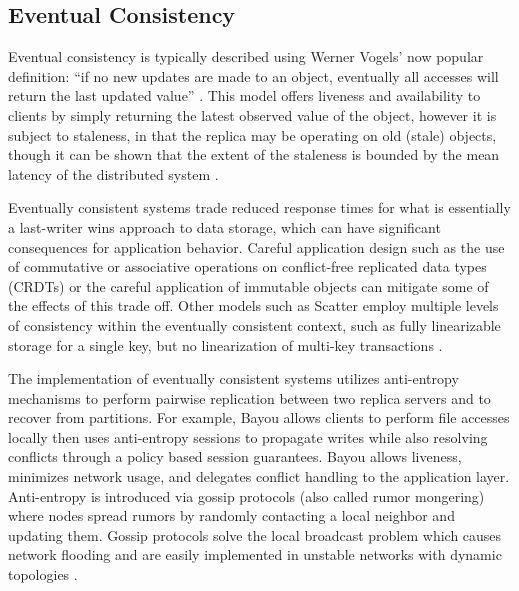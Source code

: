 \documentclass[letterpaper,twocolumn,10pt]{article}
\begin{document}
\subsection{Eventual Consistency}

Eventual consistency is typically described using Werner Vogels' now popular definition: ``if no new updates are made to an object, eventually all accesses will return the last updated value'' \cite{vogels_eventually_2009}. This model offers liveness and availability to clients by simply returning the latest observed value of the object, however it is subject to staleness, in that the replica may be operating on old (stale) objects, though it can be shown that the extent of the staleness is bounded by the mean latency of the distributed system \cite{bailis_quantifying_2014,bailis_probabilistically_2012}.

Eventually consistent systems trade reduced response times for what is essentially a last-writer wins approach to data storage, which can have significant consequences for application behavior. Careful application design such as the use of commutative or associative operations on conflict-free replicated data types (CRDTs) \cite{shapiro_conflict-free_2011} or the careful application of immutable objects \cite{helland_immutability_2015} can mitigate some of the effects of this trade off. Other models such as Scatter employ multiple levels of consistency within the eventually consistent context, such as fully linearizable storage for a single key, but no linearization of multi-key transactions \cite{glendenning_scalable_2011}.

The implementation of eventually consistent systems utilizes anti-entropy \cite{demers_epidemic_1987} mechanisms to perform pairwise replication between two replica servers and to recover from partitions. For example, Bayou allows clients to perform file accesses locally then uses \cite{terry_managing_1995,terry_session_1994} anti-entropy sessions to propagate writes while also resolving conflicts through a policy based session guarantees. Bayou allows liveness, minimizes network usage, and delegates conflict handling to the application layer. Anti-entropy is introduced via gossip protocols (also called rumor mongering) where nodes spread rumors by randomly contacting a local neighbor and updating them. Gossip protocols solve the local broadcast problem which causes network flooding and are easily implemented in unstable networks with dynamic topologies \cite{haeupler_simple_2015}.
\end{document}
